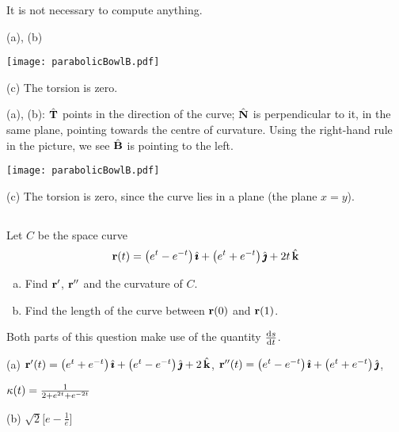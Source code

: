 \begin{hint} 
It is not necessary to compute anything.
\end{hint}

\begin{answer} 
(a), (b)

\begin{center}
       \texttt{[image: parabolicBowlB.pdf]}
\end{center}

(c) 
The torsion is zero.
\end{answer}

\begin{solution} 
(a), (b): $\hat{\mathbf{T}}$ points in the direction of the curve; $\hat{\mathbf{N}}$ is perpendicular to it, in the same plane, pointing towards the centre of curvature. Using the right-hand rule in the picture, we see $\hat{\mathbf{B}}$ is pointing to the left.

\begin{center}
       \texttt{[image: parabolicBowlB.pdf]}
\end{center}

(c) 
The torsion is zero, since the curve lies in a plane (the plane $x=y$).
\end{solution}



\subsection*{\Procedural}

\begin{question}[M317 2006A] %
Let $C$ be the space curve
\begin{align*}
\mathbf{r}(t) = \big(e^t - e^{-t}\big)\,\hat{\pmb{\imath}} + \big(e^t + e^{-t}\big)\,\hat{\pmb{\jmath}} +2t\,\hat{\mathbf{k}}
\end{align*}
\begin{enumerate}[(a)]
\item
Find $\mathbf{r}'$, $\mathbf{r}''$ and the curvature of $C$.
\item
Find the length of the curve between $\mathbf{r}(0)$ and $\mathbf{r}(1)$.
\end{enumerate}
\end{question}

\begin{hint} 
Both parts of this question make use of the quantity $\diff{s}{t}$.
\end{hint}

\begin{answer} 
(a) $\mathbf{r}'(t)=\big(e^t + e^{-t}\big)\,\hat{\pmb{\imath}} + \big(e^t - e^{-t}\big)\,\hat{\pmb{\jmath}} +2\,\hat{\mathbf{k}}$,
    $\mathbf{r}''(t)=\big(e^t - e^{-t}\big)\,\hat{\pmb{\imath}} + \big(e^t + e^{-t}\big)\,\hat{\pmb{\jmath}}$,

\hskip0.75in    $\kappa(t) =\frac{1}{2+e^{2t}+e^{-2t}}$

(b) $\sqrt{2}\Big[e-\frac{1}{e}\Big]$
\end{answer}

